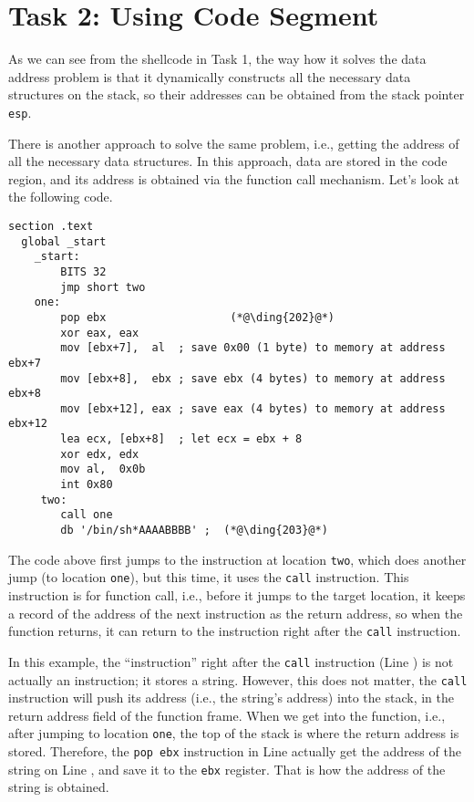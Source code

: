 \section{Task 2: Using Code Segment}

As we can see from the shellcode in Task 1, 
the way how it solves the data address problem is that 
it dynamically constructs all the necessary 
data structures on the stack,
so their addresses can be obtained from the 
stack pointer \texttt{esp}.

There is another approach to solve the same problem,
i.e., getting the address of all the necessary
data structures. In this approach, data are stored in the code
region, and its address is obtained 
via the function call mechanism. Let's look at the following
code. 

\begin{lstlisting}[caption={\texttt{mysh2.s}}]
section .text
  global _start
    _start:
        BITS 32
        jmp short two
    one:
        pop ebx                   (*@\ding{202}@*)
        xor eax, eax
        mov [ebx+7],  al  ; save 0x00 (1 byte) to memory at address ebx+7
        mov [ebx+8],  ebx ; save ebx (4 bytes) to memory at address ebx+8
        mov [ebx+12], eax ; save eax (4 bytes) to memory at address ebx+12
        lea ecx, [ebx+8]  ; let ecx = ebx + 8
        xor edx, edx
        mov al,  0x0b
        int 0x80
     two:
        call one
        db '/bin/sh*AAAABBBB' ;  (*@\ding{203}@*)
\end{lstlisting}

The code above first jumps to the instruction at 
location \texttt{two}, which does another 
jump (to location \texttt{one}), but this time,
it uses the \texttt{call} instruction.  This instruction 
is for function call, i.e., before it jumps to
the target location, it keeps a record of the address
of the next instruction as the return address, so when
the function returns, it can return to the 
instruction right after the \texttt{call} instruction.  

In this example, the ``instruction'' right after the 
\texttt{call} instruction (Line ) is not actually an instruction; 
it stores a string. However, this does not matter, the
\texttt{call} instruction will push its address (i.e.,
the string's address) into the stack, in the return
address field of the function frame. When we 
get into the function, i.e., after jumping to 
location \texttt{one}, the top of the stack 
is where the return address is stored. Therefore,
the \texttt{pop ebx} instruction in Line  actually
get the address of the string on Line , 
and save it to the \texttt{ebx} register. That is how the 
address of the string is obtained. 


